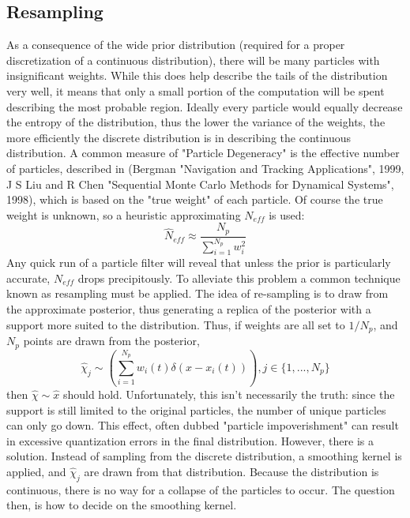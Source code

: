 \subsection{Resampling}
\label{sec:Particle Filter Resampling}
As a consequence 
of the wide prior distribution (required for a proper discretization of a continuous
distribution), there will be many particles with insignificant weights. While this does help
describe the tails of the distribution very well, it means that only a small portion of the
computation will be spent describing the most probable region. Ideally every particle would 
equally decrease the entropy of the distribution, thus the lower the variance of the weights,
the more efficiently the discrete distribution is in describing the continuous distribution. 
A common measure of "Particle Degeneracy" is the effective number of particles, described
in (Bergman "Navigation and Tracking Applications", 1999, J S Liu and R Chen "Sequential 
Monte Carlo Methods for Dynamical Systems", 1998), which is based on the "true weight"
of each particle. Of course the true weight is unknown, so a heuristic approximating 
$N_{eff}$ is used:
\begin{equation}
\hat{N}_{eff} \approx \frac{N_p}{\sum_{i=1}^{N_p} w_i^2}
\label{eq:neff}
\end{equation}
Any quick run of a particle filter will reveal that unless the prior is particularly accurate,
$N_{eff}$ drops precipitously.  To alleviate this problem
a common technique known as resampling must be applied. The idea of re-sampling is to 
draw from the approximate posterior, thus generating a replica of the posterior with 
a support more suited to the distribution. Thus, if weights are all set to $1/N_p$, and 
$N_p$ points are drawn from the posterior,
\begin{equation}
\hat{\chi}_j \sim \left(\sum_{i=1}^{N_p} w_i(t)\delta(x - x_i(t))\right), j \in \{1, ..., N_p\}
\end{equation}
then $\hat{\chi} \sim \hat{x}$ should hold. Unfortunately, this isn't necessarily the truth: since the support is
still limited to the original particles, the number of unique particles can only go down.
This effect, often dubbed "particle impoverishment" can result in excessive quantization
errors in the final distribution. However, there is a solution. Instead of sampling from the
discrete distribution, a smoothing kernel is applied, and $\hat{\chi}_j$ are drawn from
that distribution. Because the distribution is continuous, there is no way for a collapse
of the particles to occur. The question then, is how to decide on the smoothing kernel. 
